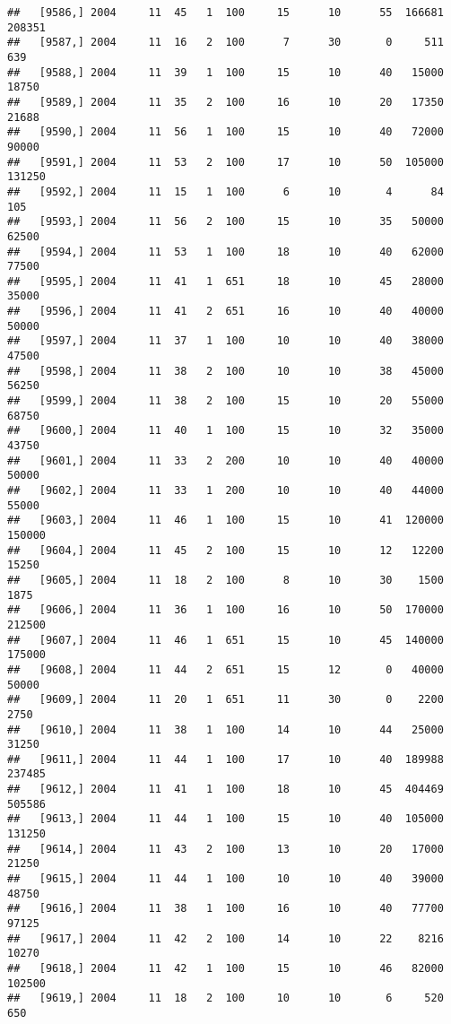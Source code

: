 \documentclass{article}\usepackage[]{graphicx}\usepackage[]{color}
\makeatletter
\newenvironment{kframe}{%
 \def\at@end@of@kframe{}%
 \ifinner\ifhmode%
  \def\at@end@of@kframe{\end{minipage}}%
  \begin{minipage}{\columnwidth}%
 \fi\fi%
 \def\FrameCommand##1{\hskip\@totalleftmargin \hskip-\fboxsep
 \colorbox{shadecolor}{##1}\hskip-\fboxsep
     \hskip-\linewidth \hskip-\@totalleftmargin \hskip\columnwidth}%
 \MakeFramed {\advance\hsize-\width
   \@totalleftmargin\z@ \linewidth\hsize
   \@setminipage}}%
 {\par\unskip\endMakeFramed%
 \at@end@of@kframe}
\newenvironment{knitrout}{}{} %
\makeatother
\begin{document}
\begin{knitrout}
\begin{kframe}
\begin{verbatim}
##   [9586,] 2004     11  45   1  100     15      10      55  166681  208351
##   [9587,] 2004     11  16   2  100      7      30       0     511     639
##   [9588,] 2004     11  39   1  100     15      10      40   15000   18750
##   [9589,] 2004     11  35   2  100     16      10      20   17350   21688
##   [9590,] 2004     11  56   1  100     15      10      40   72000   90000
##   [9591,] 2004     11  53   2  100     17      10      50  105000  131250
##   [9592,] 2004     11  15   1  100      6      10       4      84     105
##   [9593,] 2004     11  56   2  100     15      10      35   50000   62500
##   [9594,] 2004     11  53   1  100     18      10      40   62000   77500
##   [9595,] 2004     11  41   1  651     18      10      45   28000   35000
##   [9596,] 2004     11  41   2  651     16      10      40   40000   50000
##   [9597,] 2004     11  37   1  100     10      10      40   38000   47500
##   [9598,] 2004     11  38   2  100     10      10      38   45000   56250
##   [9599,] 2004     11  38   2  100     15      10      20   55000   68750
##   [9600,] 2004     11  40   1  100     15      10      32   35000   43750
##   [9601,] 2004     11  33   2  200     10      10      40   40000   50000
##   [9602,] 2004     11  33   1  200     10      10      40   44000   55000
##   [9603,] 2004     11  46   1  100     15      10      41  120000  150000
##   [9604,] 2004     11  45   2  100     15      10      12   12200   15250
##   [9605,] 2004     11  18   2  100      8      10      30    1500    1875
##   [9606,] 2004     11  36   1  100     16      10      50  170000  212500
##   [9607,] 2004     11  46   1  651     15      10      45  140000  175000
##   [9608,] 2004     11  44   2  651     15      12       0   40000   50000
##   [9609,] 2004     11  20   1  651     11      30       0    2200    2750
##   [9610,] 2004     11  38   1  100     14      10      44   25000   31250
##   [9611,] 2004     11  44   1  100     17      10      40  189988  237485
##   [9612,] 2004     11  41   1  100     18      10      45  404469  505586
##   [9613,] 2004     11  44   1  100     15      10      40  105000  131250
##   [9614,] 2004     11  43   2  100     13      10      20   17000   21250
##   [9615,] 2004     11  44   1  100     10      10      40   39000   48750
##   [9616,] 2004     11  38   1  100     16      10      40   77700   97125
##   [9617,] 2004     11  42   2  100     14      10      22    8216   10270
##   [9618,] 2004     11  42   1  100     15      10      46   82000  102500
##   [9619,] 2004     11  18   2  100     10      10       6     520     650

\end{verbatim}
\end{kframe}
\end{knitrout}
\end{document}
